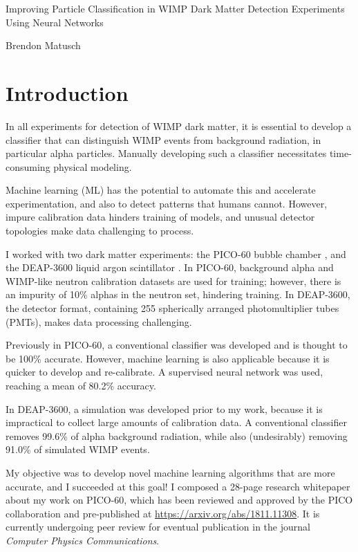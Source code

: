 \documentclass[12pt]{article}
\begin{document}
\begin{center}
    \begin{Large}
        Improving Particle Classification in WIMP Dark Matter Detection Experiments Using Neural Networks
    \end{Large}

    Brendon Matusch
\end{center}

\section{Introduction}

In all experiments for detection of WIMP dark matter, it is essential to develop a classifier that can distinguish WIMP events from background radiation, in particular alpha particles. Manually developing such a classifier necessitates time-consuming physical modeling.

Machine learning (ML) has the potential to automate this and accelerate experimentation, and also to detect patterns that humans cannot. However, impure calibration data hinders training of models, and unusual detector topologies make data challenging to process.

I worked with two dark matter experiments: the PICO-60 bubble chamber \cite{pico}, and the DEAP-3600 liquid argon scintillator \cite{deap}. In PICO-60, background alpha and WIMP-like neutron calibration datasets are used for training; however, there is an impurity of 10\% alphas in the neutron set, hindering training. In DEAP-3600, the detector format, containing 255 spherically arranged photomultiplier tubes (PMTs), makes data processing challenging.

Previously in PICO-60, a conventional classifier was developed and is thought to be 100\% accurate. However, machine learning is also applicable because it is quicker to develop and re-calibrate. A supervised neural network was used, reaching a mean of 80.2\% accuracy.

In DEAP-3600, a simulation was developed prior to my work, because it is impractical to collect large amounts of calibration data. A conventional classifier removes 99.6\% of alpha background radiation, while also (undesirably) removing 91.0\% of simulated WIMP events.

My objective was to develop novel machine learning algorithms that are more accurate, and I succeeded at this goal! I composed a 28-page research whitepaper \cite{me} about my work on PICO-60, which has been reviewed and approved by the PICO collaboration and pre-published at \url{https://arxiv.org/abs/1811.11308}. It is currently undergoing peer review for eventual publication in the journal \textit{Computer Physics Communications}.
\end{document}
